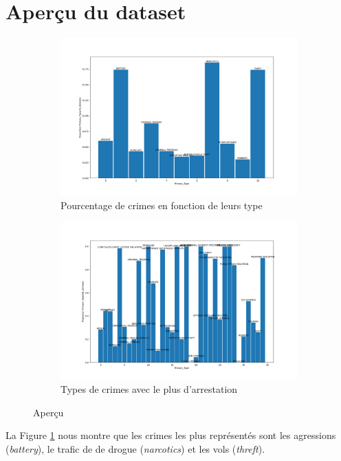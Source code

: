 \documentclass{article}
\begin{document}
    \section{Aperçu du dataset}
    \begin{figure}[H]
	    \centering
	    \begin{subfigure}{.45\textwidth}
		    \includegraphics[scale=.2]{images/pprimarytype.png}
		    \caption{Pourcentage de crimes en fonction de leurs type}
		    \label{A}
	    \end{subfigure}
	    \begin{subfigure}{.45\textwidth}
		    \includegraphics[scale=.2]{images/typeArrestation.png}
		    \caption{Types de crimes avec le plus d'arrestation}
		    \label{B}
	    \end{subfigure}
	    \caption{Aperçu }
    \end{figure}
    La Figure \ref{A} nous montre que les crimes les plus représentés sont les 
    agressions (\textit{battery}), le trafic de de drogue (\textit{narcotics}) 
    et les vols (\textit{threft}).
\end{document}
